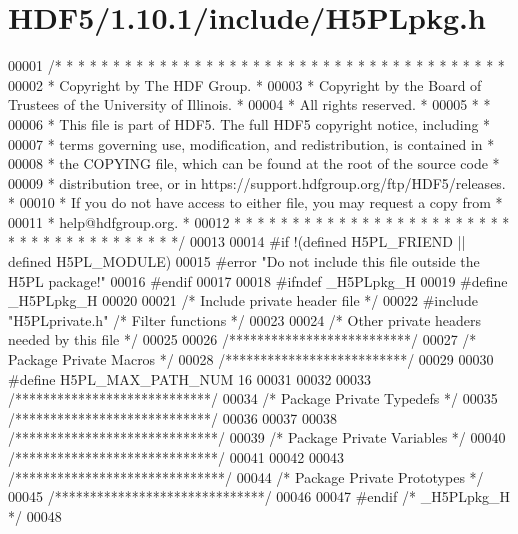 \hypertarget{_h_d_f5_21_810_81_2include_2_h5_p_lpkg_8h_source}{}\section{H\+D\+F5/1.10.1/include/\+H5\+P\+Lpkg.h}
\label{_h_d_f5_21_810_81_2include_2_h5_p_lpkg_8h_source}

\begin{DoxyCode}
00001 \textcolor{comment}{/* * * * * * * * * * * * * * * * * * * * * * * * * * * * * * * * * * * * * * *}
00002 \textcolor{comment}{ * Copyright by The HDF Group.                                               *}
00003 \textcolor{comment}{ * Copyright by the Board of Trustees of the University of Illinois.         *}
00004 \textcolor{comment}{ * All rights reserved.                                                      *}
00005 \textcolor{comment}{ *                                                                           *}
00006 \textcolor{comment}{ * This file is part of HDF5.  The full HDF5 copyright notice, including     *}
00007 \textcolor{comment}{ * terms governing use, modification, and redistribution, is contained in    *}
00008 \textcolor{comment}{ * the COPYING file, which can be found at the root of the source code       *}
00009 \textcolor{comment}{ * distribution tree, or in https://support.hdfgroup.org/ftp/HDF5/releases.  *}
00010 \textcolor{comment}{ * If you do not have access to either file, you may request a copy from     *}
00011 \textcolor{comment}{ * help@hdfgroup.org.                                                        *}
00012 \textcolor{comment}{ * * * * * * * * * * * * * * * * * * * * * * * * * * * * * * * * * * * * * * */}
00013 
00014 \textcolor{preprocessor}{#if !(defined H5PL\_FRIEND || defined H5PL\_MODULE)}
00015 \textcolor{preprocessor}{#error "Do not include this file outside the H5PL package!"}
00016 \textcolor{preprocessor}{#endif}
00017 
00018 \textcolor{preprocessor}{#ifndef \_H5PLpkg\_H}
00019 \textcolor{preprocessor}{#define \_H5PLpkg\_H}
00020 
00021 \textcolor{comment}{/* Include private header file */}
00022 \textcolor{preprocessor}{#include "H5PLprivate.h"}          \textcolor{comment}{/* Filter functions                */}
00023 
00024 \textcolor{comment}{/* Other private headers needed by this file */}
00025 
00026 \textcolor{comment}{/**************************/}
00027 \textcolor{comment}{/* Package Private Macros */}
00028 \textcolor{comment}{/**************************/}
00029 
00030 \textcolor{preprocessor}{#define H5PL\_MAX\_PATH\_NUM       16}
00031 
00032 
00033 \textcolor{comment}{/****************************/}
00034 \textcolor{comment}{/* Package Private Typedefs */}
00035 \textcolor{comment}{/****************************/}
00036 
00037 
00038 \textcolor{comment}{/*****************************/}
00039 \textcolor{comment}{/* Package Private Variables */}
00040 \textcolor{comment}{/*****************************/}
00041 
00042 
00043 \textcolor{comment}{/******************************/}
00044 \textcolor{comment}{/* Package Private Prototypes */}
00045 \textcolor{comment}{/******************************/}
00046 
00047 \textcolor{preprocessor}{#endif }\textcolor{comment}{/* \_H5PLpkg\_H */}\textcolor{preprocessor}{}
00048 
\end{DoxyCode}
